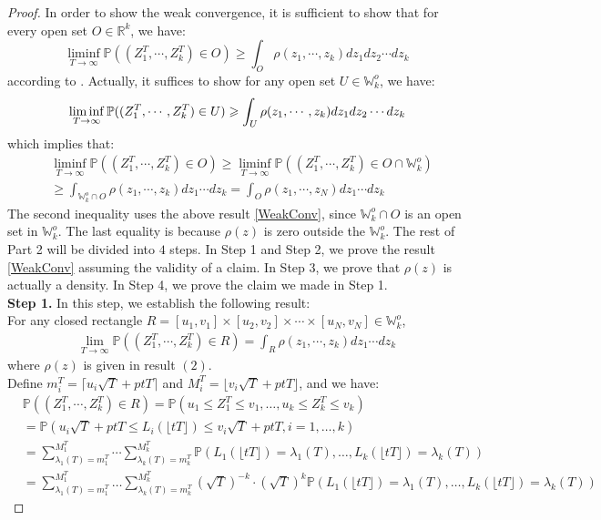 \begin{proof}
In order to show the weak convergence, it is sufficient to show that for every open set $O\in\mathbb{R}^{k}$, we have: 
$$\liminf_{T\rightarrow\infty}\mathbb{P}((Z_{1}^{T},\cdots,Z_{k}^{T})\in O)\geqslant\int_{O}\rho(z_{1},\cdots,z_{k})dz_{1}dz_{2}\cdots dz_{k}$$
according to \cite[Theorem 3.2.11]{Durrett}. Actually, it suffices to show for any open set $U\in\mathbb{W}_{k}^{o}$, we have:
\begin{align}{\label{WeakConv}}
	\liminf_{T\rightarrow\infty}\mathbb{P}((Z_{1}^{T},\cdots,Z_{k}^{T})\in U)\geqslant\int_{U}\rho(z_{1},\cdots,z_{k})dz_{1}dz_{2}\cdots dz_{k}
\end{align}
which implies that:
\begin{align*}
	&\liminf_{T\rightarrow\infty}\mathbb{P}((Z_{1}^{T},\cdots,Z_{k}^{T})\in O)\geqslant\liminf_{T\rightarrow\infty}\mathbb{P}((Z_{1}^{T},\cdots,Z_{k}^{T})\in O\cap\mathbb{W}_{k}^{o})\\
	&\geqslant \int_{\mathbb{W}_{k}^{o}\cap O}\rho(z_{1},\cdots,z_{k})dz_{1}\cdots dz_{k}= \int_{O}\rho(z_{1},\cdots,z_{N})dz_{1}\cdots dz_{k}
\end{align*}
The second inequality uses the above result \ref{WeakConv}, since $\mathbb{W}_{k}^{o}\cap O$ is an open set in $\mathbb{W}_{k}^{o}$. The last equality is because $\rho(z)$ is zero outside the $\mathbb{W}_{k}^{o}$. The rest of Part 2 will be divided into $4$ steps. In Step 1 and Step 2, we prove the result \ref{WeakConv} assuming the validity of a claim. In Step 3, we prove that $\rho(z)$ is actually a density. In Step 4, we prove the claim we made in Step 1.\\
\textbf{Step 1. }In this step, we establish the following result:\\
For any closed rectangle $R=[u_{1},v_{1}]\times [u_{2},v_{2}]\times\cdots\times[u_{N},v_{N}]\in\mathbb{W}_{k}^{o}$, 
\begin{align}
	\lim_{T\rightarrow\infty}\mathbb{P}((Z_{1}^{T},\cdots,Z_{k}^{T})\in R)=\int_{R}\rho(z_{1},\cdots,z_{k})dz_{1}\cdots dz_{k}
\end{align}
where $\rho(z)$ is given in result $(2)$.\\

Define $m_{i}^{T}=\lceil u_{i}\sqrt{T}+ptT\rceil$ and $M_{i}^{T}=\lfloor v_{i}\sqrt{T}+ptT\rfloor$, and we have:
\begin{align*}
&\mathbb{P}((Z_{1}^{T},\cdots,Z_{k}^{T})\in R)=\mathbb{P}(u_{1}\leqslant Z_{1}^{T} \leqslant v_{1}, \dots,  u_{k}\leqslant Z_{k}^{T} \leqslant v_{k})\\
&=\mathbb{P}(u_{i}\sqrt{T}+ptT\leqslant L_{i}(\lfloor tT\rfloor) \leqslant v_{i}\sqrt{T}+ptT, i=1,\dots, k)\\
&=\sum_{\lambda_{1}(T)=m_{1}^{T}}^{M_{1}^{T}}\cdots\sum_{\lambda_{k}(T)=m_{k}^{T}}^{M_{k}^{T}}\mathbb{P}(L_{1}(\lfloor tT \rfloor)=\lambda_{1}(T),\dots,L_{k}(\lfloor tT \rfloor)=\lambda_{k}(T))\\
&=\sum_{\lambda_{1}(T)=m_{1}^{T}}^{M_{1}^{T}}\dots\sum_{\lambda_{k}(T)=m_{k}^{T}}^{M_{k}^{T}}(\sqrt{T})^{-k}\cdot(\sqrt{T})^{k}\mathbb{P}(L_{1}(\lfloor tT \rfloor)=\lambda_{1}(T),\dots,L_{k}(\lfloor tT \rfloor)=\lambda_{k}(T))
\end{align*}


\end{proof}
